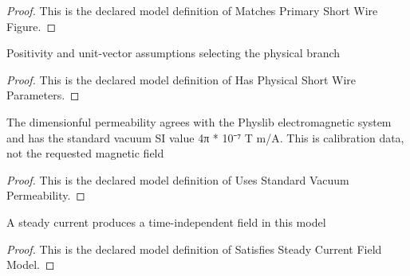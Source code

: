 \begin{proof}
  This is the declared model definition of Matches Primary Short Wire Figure.
\end{proof}
\begin{definition}
  \label{def:physics:phyx-mini-0916:phyxminiproblems-problemphyxmini0916-hasphysicalshortwireparameters}
  Positivity and unit-vector assumptions selecting the physical branch
\end{definition}
\begin{proof}
  This is the declared model definition of Has Physical Short Wire Parameters.
\end{proof}
\begin{definition}
  \label{def:physics:phyx-mini-0916:phyxminiproblems-problemphyxmini0916-usesstandardvacuumpermeability}
  The dimensionful permeability agrees with the Physlib electromagnetic system and has the standard vacuum SI value 4π * 10⁻⁷ T m/A. This is calibration data, not the requested magnetic field
\end{definition}
\begin{proof}
  This is the declared model definition of Uses Standard Vacuum Permeability.
\end{proof}
\begin{definition}
  \label{def:physics:phyx-mini-0916:phyxminiproblems-problemphyxmini0916-satisfiessteadycurrentfieldmodel}
  A steady current produces a time-independent field in this model
\end{definition}
\begin{proof}
  This is the declared model definition of Satisfies Steady Current Field Model.
\end{proof}
